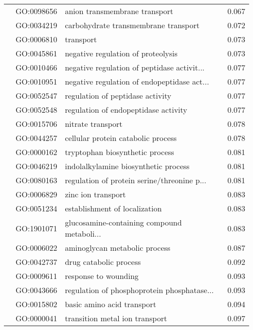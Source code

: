 \begin{longtable}{lllr}
   & GO:0098656 &                anion transmembrane transport &         0.067 \\
   & GO:0034219 &         carbohydrate transmembrane transport &         0.072 \\
   & GO:0006810 &                                    transport &         0.073 \\
   & GO:0045861 &           negative regulation of proteolysis &         0.073 \\
   & GO:0010466 &  negative regulation of peptidase activit... &         0.077 \\
   & GO:0010951 &  negative regulation of endopeptidase act... &         0.077 \\
   & GO:0052547 &             regulation of peptidase activity &         0.077 \\
   & GO:0052548 &         regulation of endopeptidase activity &         0.077 \\
   & GO:0015706 &                            nitrate transport &         0.078 \\
   & GO:0044257 &           cellular protein catabolic process &         0.078 \\
   & GO:0000162 &              tryptophan biosynthetic process &         0.081 \\
   & GO:0046219 &         indolalkylamine biosynthetic process &         0.081 \\
   & GO:0080163 &  regulation of protein serine/threonine p... &         0.081 \\
   & GO:0006829 &                           zinc ion transport &         0.083 \\
   & GO:0051234 &                establishment of localization &         0.083 \\
   & GO:1901071 &  glucosamine-containing compound metaboli... &         0.083 \\
   & GO:0006022 &                aminoglycan metabolic process &         0.087 \\
   & GO:0042737 &                       drug catabolic process &         0.092 \\
   & GO:0009611 &                         response to wounding &         0.093 \\
   & GO:0043666 &  regulation of phosphoprotein phosphatase... &         0.093 \\
   & GO:0015802 &                   basic amino acid transport &         0.094 \\
   & GO:0000041 &               transition metal ion transport &         0.097 \\

\end{longtable}
